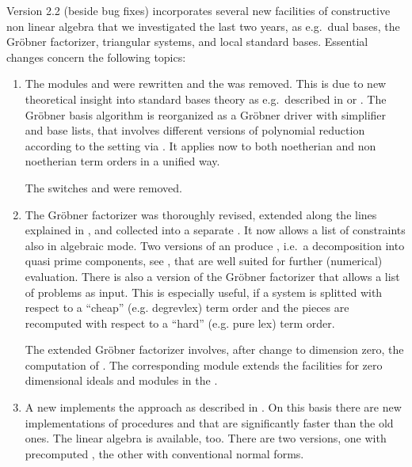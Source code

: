 Version 2.2 (beside bug fixes) incorporates several new facilities of
constructive non linear algebra that we investigated the last two
years, as e.g.\ dual bases, the Gr\"obner factorizer, triangular systems, and
local standard bases. Essential changes concern the following topics:
\begin{enumerate}
\item The  modules  and  were rewritten and
the  was removed. This is
due to new theoretical insight into standard bases theory as
e.g.\ described in \cite{Graebe:94} or \cite{Graebe:95a}. The Gr\"obner basis algorithm
is reorganized as a Gr\"obner driver with simplifier and base lists, that
involves different versions of polynomial reduction according to the
setting via . It applies now to
both noetherian and non noetherian term orders in a unified way.

The switches  and   were removed.

\item The Gr\"obner factorizer was thoroughly revised, extended along the
lines explained in \cite{Graebe:94a}, and collected into a separate
. It now allows a list of constraints also in
algebraic mode. Two versions of an 
produce ,
i.e.\ a decomposition into quasi prime components, see \cite{Graebe:95b},
that are well suited for further (numerical) evaluation. There is also
a version of the Gr\"obner factorizer that allows a list of problems as
input. This is especially useful, if a system is splitted with respect
to a ``cheap'' (e.g. degrevlex) term order and the pieces are
recomputed with respect to a ``hard'' (e.g. pure lex) term order.

The extended Gr\"obner factorizer involves, after change to dimension zero,
the computation of . The corresponding module
 extends the facilities for zero dimensional ideals and
modules in the .

\item A new  implements the  approach
as described in \cite{Marinari:91}. On this basis there are new
implementations of procedures  and  that
are significantly faster than the old ones. The linear algebra
 \cite{Faugere:93} is available, too. There are
two versions, one with precomputed , the other with
conventional normal forms.


\end{enumerate}
